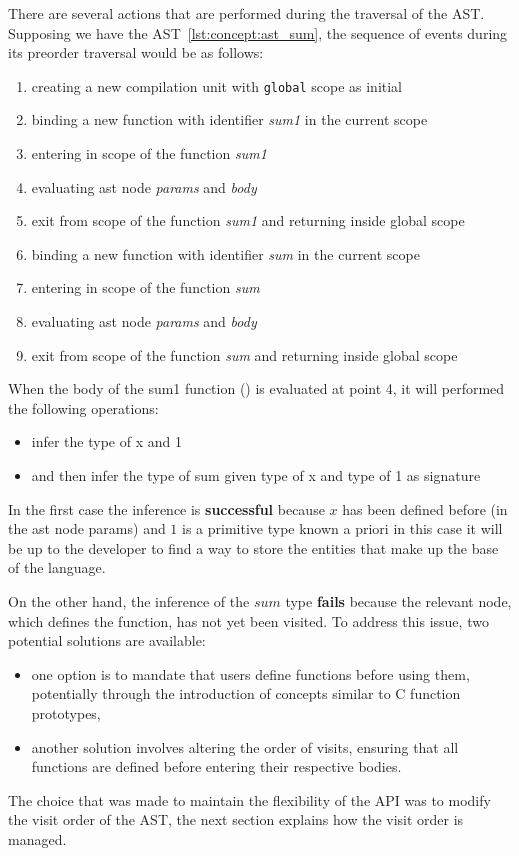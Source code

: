 There are several actions that are performed during the traversal of the AST.
Supposing we have the AST~\ref{lst:concept:ast_sum}, the sequence of events during its preorder traversal would be as follows:
\begin{enumerate}
    \item creating a new compilation unit with \texttt{global} scope as initial
    \item binding a new function with identifier \textit{sum1} in the current scope
    \item entering in scope of the function \textit{sum1}
    \item \label{itm:ast-node-eval} evaluating ast node \textit{params} and \textit{body}
    \item exit from scope of the function \textit{sum1} and returning inside global scope
    \item binding a new function with identifier \textit{sum} in the current scope
    \item entering in scope of the function \textit{sum}
    \item evaluating ast node \textit{params} and \textit{body}
    \item exit from scope of the function \textit{sum} and returning inside global scope
\end{enumerate}
When the body of the sum1 function () is evaluated at point 4, it will performed the following operations:
\begin{itemize}
    \item infer the type of x and 1
    \item and then infer the type of sum given type of x and type of 1 as signature
\end{itemize}

In the first case the inference is \textbf{successful} because $x$ has been defined before (in the ast node params) and $1$ is a primitive type known a priori in this case it will be up to the developer to find a way to store the entities that make up the base of the language.

On the other hand, the inference of the $sum$ type \textbf{fails} because the relevant node, which defines the function, has not yet been visited.
To address this issue, two potential solutions are available:
\begin{itemize}
    \item one option is to mandate that users define functions before using them, potentially through the introduction of concepts similar to C function prototypes,
    \item another solution involves altering the order of visits, ensuring that all functions are defined before entering their respective bodies.
\end{itemize}
The choice that was made to maintain the flexibility of the API was to modify the visit order of the AST, the next section explains how the visit order is managed.


